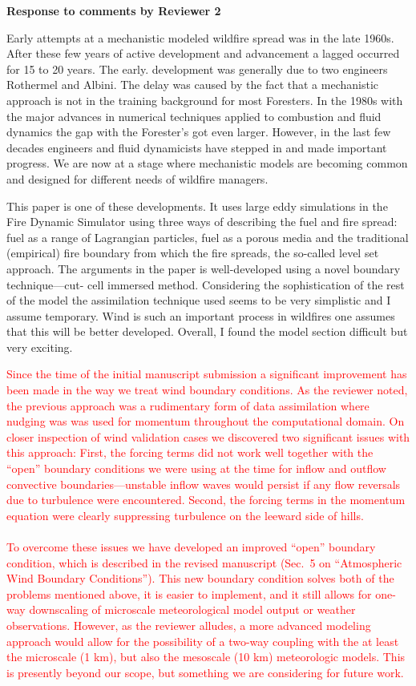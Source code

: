 \documentclass[12pt]{article}
\newcommand\hl[1]{\textcolor{red}{#1}}
\begin{document}
\begin{center}
{\bf Response to comments by Reviewer 2}
\end{center}

Early attempts at a mechanistic modeled wildfire spread was in the late 1960s. After these few
years of active development and advancement a lagged occurred for 15 to 20 years. The early.
development was generally due to two engineers Rothermel and Albini. The delay was caused
by the fact that a mechanistic approach is not in the training background for most Foresters. In
the 1980s with the major advances in numerical techniques applied to combustion and fluid
dynamics the gap with the Forester’s got even larger. However, in the last few decades
engineers and fluid dynamicists have stepped in and made important progress. We are now at a
stage where mechanistic models are becoming common and designed for different needs of
wildfire managers.

This paper is one of these developments. It uses large eddy simulations in the Fire Dynamic
Simulator using three ways of describing the fuel and fire spread: fuel as a range of Lagrangian
particles, fuel as a porous media and the traditional (empirical) fire boundary from which the
fire spreads, the so-called level set approach. The arguments in the paper is well-developed
using a novel boundary technique—cut- cell immersed method. Considering the sophistication
of the rest of the model the assimilation technique used seems to be very simplistic and I
assume temporary. Wind is such an important process in wildfires one assumes that this will be
better developed. Overall, I found the model section difficult but very exciting.

\hl{Since the time of the initial manuscript submission a significant improvement has been made in the way we treat wind boundary conditions.  As the reviewer noted, the previous approach was a rudimentary form of data assimilation where nudging was was used for momentum throughout the computational domain.  On closer inspection of wind validation cases we discovered two significant issues with this approach: First, the forcing terms did not work well together with the ``open'' boundary conditions we were using at the time for inflow and outflow convective boundaries---unstable inflow waves would persist if any flow reversals due to turbulence were encountered.  Second, the forcing terms in the momentum equation were clearly suppressing turbulence on the leeward side of hills. \\ \\
To overcome these issues we have developed an improved ``open'' boundary condition, which is described in the revised manuscript (Sec.~5 on ``Atmospheric Wind Boundary Conditions'').  This new boundary condition solves both of the problems mentioned above, it is easier to implement, and it still allows for one-way downscaling of microscale meteorological model output or weather observations.  However, as the reviewer alludes, a more advanced modeling approach would allow for the possibility of a two-way coupling with the at least the microscale (1 km), but also the mesoscale (10 km) meteorologic models.  This is presently beyond our scope, but something we are considering for future work.}
\end{document}
